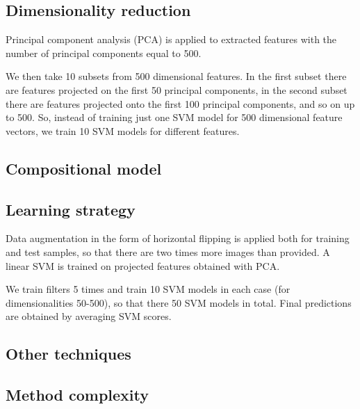 \documentclass{article}
\begin{document}
\subsection{Dimensionality reduction}
Principal component analysis (PCA) is applied to extracted features with the number of principal components equal to 500. 

We then take 10 subsets from 500 dimensional features. 
In the first subset there are features projected on the first 50 principal components, in the second subset there are features projected onto the first 100 principal components, and so on up to 500. 
So, instead of training just one SVM model for 500 dimensional feature vectors, we train 10 SVM models for different features.

\subsection{Compositional model}

\subsection{Learning strategy}
Data augmentation in the form of horizontal flipping is applied both for training and test samples, so that there are two times more images than provided.
A linear SVM is trained on projected features obtained with PCA.

We train filters 5 times and train 10 SVM models in each case (for dimensionalities 50-500), so that there 50 SVM models in total. Final predictions are obtained by averaging SVM scores.

\subsection{Other techniques}

\subsection{Method complexity}
\end{document}
